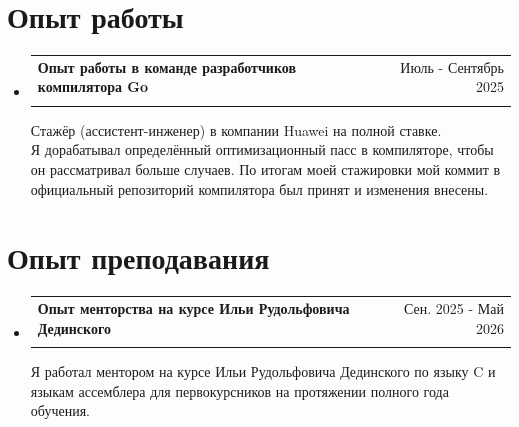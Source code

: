 \documentclass[A4,11pt]{article}
\makeatletter
\newcommand{\CVItem}[1]{
  \item\small{
    {#1 \vspace{-2pt}}
  }
}
\newcommand{\CVSubheading}[4]{
  \vspace{-2pt}\item
    \begin{tabular*}{0.97\textwidth}[t]{l@{\extracolsep{\fill}}r}
      \textbf{#1} & #2 \\
      \small#3 & \small #4 \\
    \end{tabular*}\vspace{-7pt}
}
\newcommand{\CVSubHeadingListStart}{\begin{itemize}[leftmargin=0.5cm, label={}]}
\newcommand{\CVSubHeadingListEnd}{\end{itemize}}
\newcommand{\CVItemListStart}{\begin{itemize}}
\newcommand{\CVItemListEnd}{\end{itemize}\vspace{-5pt}}
\makeatother
\begin{document}

\section{Опыт работы}
  \CVSubHeadingListStart
    \CVSubheading
      {Опыт работы в команде разработчиков компилятора Go}{Июль - Сентябрь 2025}
      {}{}
      \small{Стажёр (ассистент-инженер) в компании Huawei на полной ставке. \\ Я дорабатывал определённый оптимизационный пасс в компиляторе, чтобы он рассматривал больше случаев. По итогам моей стажировки мой коммит в официальный репозиторий компилятора был принят и изменения внесены.}
  \CVSubHeadingListEnd

\section{Опыт преподавания}
  \CVSubHeadingListStart
    \CVSubheading
      {Опыт менторства на курсе Ильи Рудольфовича Дединского}{Сен. 2025 - Май 2026}
      {}{}
      \small{Я работал ментором на курсе Ильи Рудольфовича Дединского по языку C и языкам ассемблера для первокурсников на протяжении полного года обучения.}
  \CVSubHeadingListEnd

\end{document}
